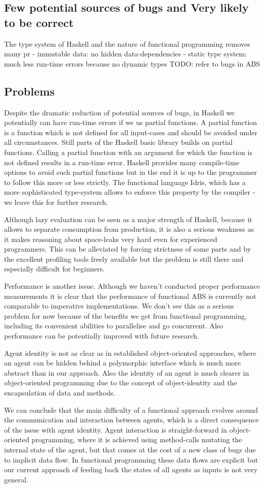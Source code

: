 \subsection{Few potential sources of bugs and Very likely to be correct}
The type system of Haskell and the nature of functional programming removes many pr
- immutable data: no hidden data-dependencies
- static type system: much less run-time errors because no dynamic types
TODO: refer to bugs in ABS

\subsection{Problems}
Despite the dramatic reduction of potential sources of bugs, in Haskell we potentially can have run-time errors if we us partial functions. A partial function is a function which is not defined for all input-cases and should be avoided under all circumstances. Still parts of the Haskell basic library builds on partial functions. Calling a partial function with an argument for which the function is not defined results in a run-time error. Haskell provides many compile-time options to avoid such partial functions but in the end it is up to the programmer to follow this more or less strictly. The functional language Idris, which has a more sophisticated type-system allows to enforce this property by the compiler - we leave this for further research.

Although lazy evaluation can be seen as a major strength of Haskell, because it allows to separate consumption from production, it is also a serious weakness as it makes reasoning about space-leaks very hard even for experienced programmers. This can be alleviated by forcing strictness of some parts and by the excellent profiling tools freely available but the problem is still there and especially difficult for beginners.

Performance is another issue. Although we haven't conducted proper performance measurements it is clear that the performance of functional ABS is currently not comparable to imperative implementations. We don't see this as a serious problem for now because of the benefits we get from functional programming, including its convenient abilities to parallelise and go concurrent. Also performance can be potentially improved with future research.

Agent identity is not as clear as in established object-oriented approaches, where an agent can be hidden behind a polymorphic interface which is much more abstract than in our approach. Also the identity of an agent is much clearer in object-oriented programming due to the concept of object-identity and the encapsulation of data and methods.

We can conclude that the main difficulty of a functional approach evolves around the communication and interaction between agents, which is a direct consequence of the issue with agent identity. Agent interaction is straight-forward in object-oriented programming, where it is achieved using method-calls mutating the internal state of the agent, but that comes at the cost of a new class of bugs due to implicit data flow. In functional programming these data flows are explicit but our current approach of feeding back the states of all agents as inputs is not very general.
